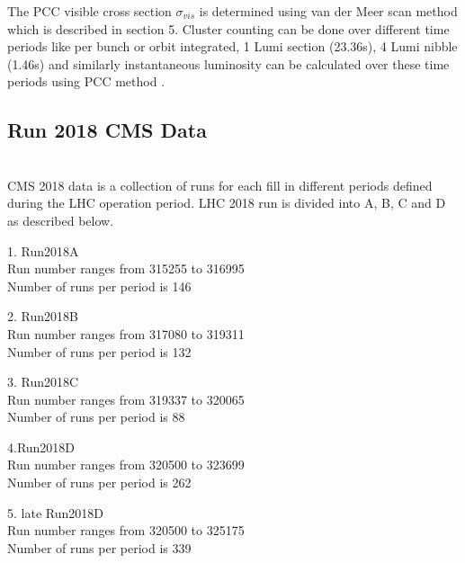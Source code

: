 The PCC visible cross section $\sigma_{vis}$ is determined using van der Meer scan method which is described in section 5. Cluster counting can be done over different time periods like per bunch or orbit integrated, 1 Lumi section (23.36s), 4 Lumi nibble (1.46s) and similarly instantaneous luminosity can be calculated over these time periods using PCC method \cite{CMS:2018elu}. \\

\subsection{Run 2018 CMS Data} \\

CMS 2018 data is a collection of runs for each fill in different periods defined during the LHC operation period. LHC 2018 run is divided into A, B, C and D as described below. \\

\begin{flushleft}
1. Run2018A \\
Run number ranges from 315255 to 316995 \\
Number of runs per period is 146 \\
\end{flushleft}

  \begin{flushleft}
2. Run2018B\\
Run number ranges from 317080 to 319311\\
Number of runs per period is 132\\
\end{flushleft}

  \begin{flushleft}
3. Run2018C \\
Run number ranges from 319337 to 320065\\
Number of runs per period is 88 \\
\end{flushleft}

  \begin{flushleft}
4.Run2018D \\
Run number ranges from 320500 to 323699 \\
Number of runs per period is 262 \\
\end{flushleft}

  \begin{flushleft}
5. late Run2018D \\
Run number ranges from 320500 to 325175 \\
Number of runs per period is 339 \\
\end{flushleft}

